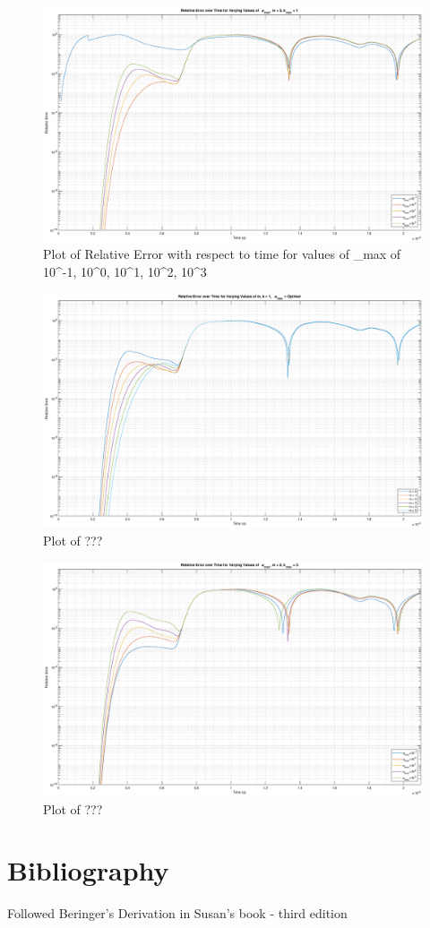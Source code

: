\documentclass{article}
\begin{document}
\begin{figure}
  \centering
  \includegraphics[width=\textwidth]{Rel_Err_SigMax_m3}
  \caption{Plot of Relative Error with respect to time for values of
    \sigma_{max} of 10^{-1}, 10^0, 10^1, 10^2, 10^3}\label{fig:RelErrSigmaxm3}
\end{figure}




\begin{figure}
  \centering
  \includegraphics[width=\textwidth]{Rel_Err_m}
  \caption{Plot of ???}\label{fig:RelErrm}
\end{figure}

\begin{figure}
  \centering
  \includegraphics[width=\textwidth]{Rel_Err_SigMax}
  \caption{Plot of ???}\label{fig:RelErrSigmax}
\end{figure}

\section{Bibliography}
Followed Beringer's Derivation in Susan's book - third edition
\end{document}
